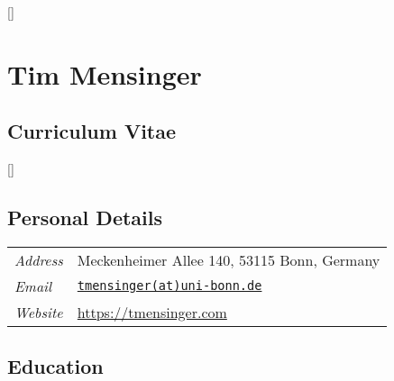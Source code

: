 \documentclass{article}
\begin{document}
\thispagestyle{empty}
\renewcommand\labelitemi{\tiny$\bullet$}

\titlespacing*{\section}{0pt}{0pt}{0pt}
\titlespacing*{\subsection}{0pt}{0pt}{0pt}

\titleformat{\section}{\normalfont\Large\bfseries}{\thesection}{1em}{}[{\titlerule[0.8pt]}]


\section*{\hfill \LARGE Tim Mensinger}\vspace*{3pt}
\subsection*{\hfill Curriculum Vitae}

\titleformat{\subsection}{\normalfont\bfseries}{\thesection}{1em}{}[{\titlerule[0.4pt]}]

\vspace{15pt}
\subsection*{Personal Details}

\begin{table}[h!]
    \renewcommand{\arraystretch}{1.4}
    \begin{tabular}{p{110pt} p{350pt}}
         \textit{Address} &  Meckenheimer Allee 140, 53115 Bonn, Germany\\
         \textit{Email} & \href{mailto:tmensinger@uni-bonn.de}{\texttt{tmensinger(at)uni-bonn.de}}\\
         \textit{Website} & \url{https://tmensinger.com}
    \end{tabular}
\end{table}


\subsection*{Education}
\end{document}

